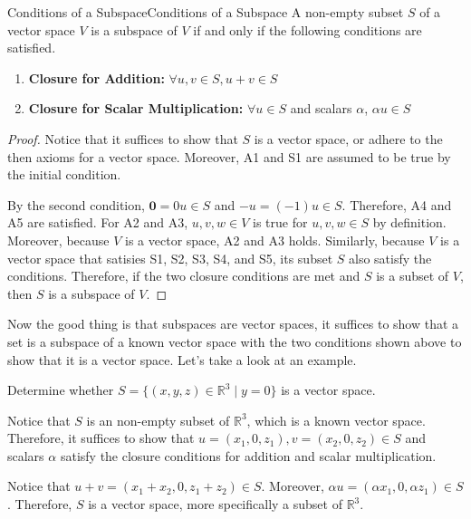 \documentclass[../main.tex]{subfiles}
\begin{document}
\begin{theorem}{Conditions of a Subspace}{Conditions of a Subspace}
A non-empty subset $S$ of a vector space $V$ is a subspace of $V$ if
and only if the following conditions are satisfied.
\begin{enumerate}[noitemsep]
\item
\textbf{Closure for Addition: }
$\forall u, v \in S, u + v \in S$
\item
\textbf{Closure for Scalar Multiplication: }
$\forall u \in S$ and scalars $\alpha$, $\alpha u \in S$
\end{enumerate}
\end{theorem}
\begin{proof}
Notice that it suffices to show that $S$ is a vector space, or adhere
to the then axioms for a vector space. Moreover, A1 and S1 are assumed
to be true by the initial condition.

By the second condition, $\mathbf{0} = 0 u \in S$ and $-u = (-1) u
\in S$. Therefore, A4 and A5 are satisfied. For A2 and A3, $u, v, w
\in V$ is true for $u, v, w \in S$ by definition. Moreover, because
$V$ is a vector space, A2 and A3 holds. Similarly, because $V$ is a
vector space that satisies S1, S2, S3, S4, and S5, its subset $S$ also
satisfy the conditions. Therefore, if the two closure conditions are
met and $S$ is a subset of $V$, then $S$ is a subspace of $V$.
\end{proof}

Now the good thing is that subspaces are vector spaces, it suffices
to show that a set is a subspace of a known vector space with the two
conditions shown above to show that it is a vector space. Let's take
a look at an example.

\begin{problem}
Determine whether $S = \{ (x, y, z) \in \mathbb{R}^3 \mid y = 0 \}$
is a vector space.
\end{problem}
\begin{solution}
Notice that $S$ is an non-empty subset of $\mathbb{R}^3$, which is a
known vector space. Therefore, it suffices to show that $u =
(x_1, 0, z_1), v = (x_2, 0, z_2) \in S$ and scalars $\alpha$ satisfy
the closure conditions for addition and scalar multiplication.

Notice that $u + v = (x_1 + x_2, 0, z_1 + z_2) \in S$. Moreover,
$\alpha u = (\alpha x_1, 0, \alpha z_1) \in S$. Therefore, $S$ is a
vector space, more specifically a subset of $\mathbb{R}^3$.
\end{solution}
\end{document}
